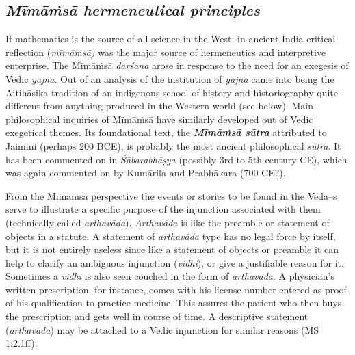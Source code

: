\subsection*{\textit{Mīmāṁsā hermeneutical principles}}

If mathematics is the source of all science in the West; in ancient India critical reflection (\textit{mīmāṁsā) }was the major source of hermeneutics and interpretive enterprise. The Mīmāṁsā \textit{darśana} arose in response to the need for an exegesis of Vedic \textit{yajña}. Out of an analysis of the institution of \textit{yajña} came into being the Aitihāsika tradition of an indigenous school of history and historiography quite different from anything produced in the Western world (see below). Main philosophical inquiries of Mīmāṁsā have similarly developed out of Vedic exegetical themes. Its foundational text, the \textbf{\textit{Mīmāṁsā sūtra}} attributed to Jaimini (perhaps 200 BCE), is probably the most ancient philosophical \textit{sūtra}. It has been commented on in \textit{Śābarabhāṣya} (possibly 3rd to 5th century CE), which was again commented on by Kumārila and Prabhākara (700 CE?).

From the Mīmāṁsā perspective the events or stories to be found in the Veda–s serve to illustrate a specific purpose of the injunction associated with them (technically called \textit{arthavāda}). \textit{Arthavāda} is like the preamble or statement of objects in a statute. A statement of \textit{arthavāda }type has no legal force by itself, but it is not entirely useless since like a statement of objects or preamble it can help to clarify an ambiguous injunction (\textit{vidhi}), or give a justifiable reason for it. Sometimes a \textit{vidhi} is also seen couched in the form of \textit{arthavāda}. A physician’s written prescription, for instance, comes with his license number entered as proof of his qualification to practice medicine. This assures the patient who then buys the prescription and gets well in course of time. A descriptive statement (\textit{arthavāda}) may be attached to a Vedic injunction for similar reasons (MS 1:2.1ff). 

